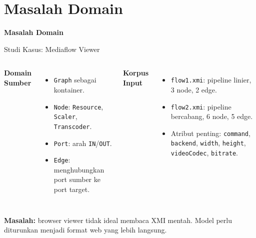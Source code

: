 \documentclass[aspectratio=169, table]{beamer}
\begin{document}
\section{Masalah Domain}
\begin{frame}{\hfill}
	\centering
	\Huge{\textbf{Masalah Domain}}
\end{frame}

\begin{frame}{Studi Kasus: Mediaflow Viewer}
\vspace{6pt}
\begin{columns}[T]
\textbf{Domain Sumber}
\begin{itemize}
  \item \texttt{Graph} sebagai kontainer.
  \item \texttt{Node}: \texttt{Resource}, \texttt{Scaler}, \texttt{Transcoder}.
  \item \texttt{Port}: arah \texttt{IN}/\texttt{OUT}.
  \item \texttt{Edge}: menghubungkan port sumber ke port target.
\end{itemize}

\textbf{Korpus Input}
\begin{itemize}
  \item \texttt{flow1.xmi}: pipeline linier, 3 node, 2 edge.
  \item \texttt{flow2.xmi}: pipeline bercabang, 6 node, 5 edge.
  \item Atribut penting: \texttt{command}, \texttt{backend}, \texttt{width}, \texttt{height}, \texttt{videoCodec}, \texttt{bitrate}.
\end{itemize}
\end{columns}

\vspace{8pt}
\textbf{Masalah:} browser viewer tidak ideal membaca XMI mentah. Model perlu diturunkan menjadi format web yang lebih langsung.
\end{frame}
\end{document}
